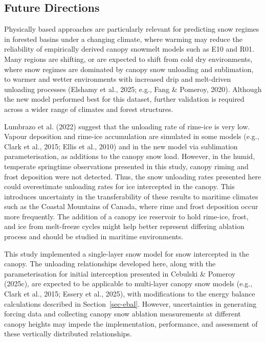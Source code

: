 \documentclass[
]{agujournal2019}
\begin{document}
\subsection{Future Directions}\label{future-directions}

Physically based approaches are particularly relevant for predicting
snow regimes in forested basins under a changing climate, where warming
may reduce the reliability of empirically derived canopy snowmelt models
such as E10 and R01. Many regions are shifting, or are expected to shift
from cold dry environments, where snow regimes are dominated by canopy
snow unloading and sublimation, to warmer and wetter environments with
increased drip and melt-driven unloading processes (Elshamy et al.,
2025; e.g., Fang \& Pomeroy, 2020). Although the new model performed
best for this dataset, further validation is required across a wider
range of climates and forest structures.

Lumbrazo et al. (2022) suggest that the unloading rate of rime-ice is
very low. Vapour deposition and rime-ice accumulation are simulated in
some models (e.g., Clark et al., 2015; Ellis et al., 2010) and in the
new model via sublimation parameterisation, as additions to the canopy
snow load. However, in the humid, temperate springtime observations
presented in this study, canopy riming and frost deposition were not
detected. Thus, the snow unloading rates presented here could
overestimate unloading rates for ice intercepted in the canopy. This
introduces uncertainty in the transferability of these results to
maritime climates such as the Coastal Mountains of Canada, where rime
and frost deposition occur more frequently. The addition of a canopy ice
reservoir to hold rime-ice, frost, and ice from melt-freeze cycles might
help better represent differing ablation process and should be studied
in maritime environments.

This study implemented a single-layer snow model for snow intercepted in
the canopy. The unloading relationships developed here, along with the
parameterisation for initial interception presented in Cebulski \&
Pomeroy (2025c), are expected to be applicable to multi-layer canopy
snow models (e.g., Clark et al., 2015; Essery et al., 2025), with
modifications to the energy balance calculations described in
Section~\ref{sec-ebal}. However, uncertainties in generating forcing
data and collecting canopy snow ablation measurements at different
canopy heights may impede the implementation, performance, and
assessment of these vertically distributed relationships.
\end{document}
